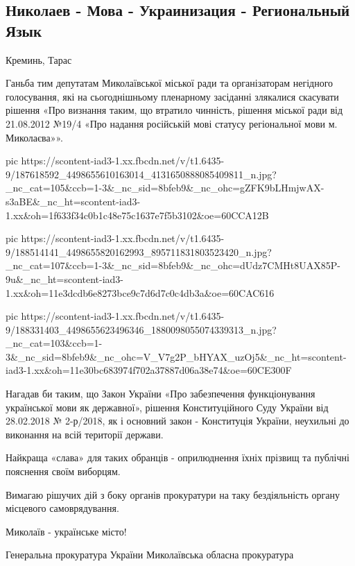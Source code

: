  
 
 
 
 

\subsection{Николаев - Мова - Украинизация - Региональный Язык}

Креминь, Тарас

Ганьба тим депутатам Миколаївської міської ради та організаторам негідного
голосування, які на сьогоднішньому пленарному засіданні злякалися скасувати
рішення «Про визнання таким, що втратило чинність, рішення міської ради від
21.08.2012 №19/4 «Про надання російській мові статусу регіональної мови м.
Миколаєва»». 

\ifcmt
  pic https://scontent-iad3-1.xx.fbcdn.net/v/t1.6435-9/187618592_4498655610163014_4131650888085409811_n.jpg?_nc_cat=105&ccb=1-3&_nc_sid=8bfeb9&_nc_ohc=gZFK9bLHmjwAX-s3aBE&_nc_ht=scontent-iad3-1.xx&oh=1f633f34c0b1c48e75c1637e7f5b3102&oe=60CCA12B

  pic https://scontent-iad3-1.xx.fbcdn.net/v/t1.6435-9/188514141_4498655820162993_895711831803523420_n.jpg?_nc_cat=107&ccb=1-3&_nc_sid=8bfeb9&_nc_ohc=dUdz7CMHt8UAX85P-9u&_nc_ht=scontent-iad3-1.xx&oh=11e3dcdb6e8273bce9c7d6d7c0c4db3a&oe=60CAC616

  pic https://scontent-iad3-1.xx.fbcdn.net/v/t1.6435-9/188331403_4498655623496346_1880098055074339313_n.jpg?_nc_cat=103&ccb=1-3&_nc_sid=8bfeb9&_nc_ohc=V_V7g2P_bHYAX_uzOj5&_nc_ht=scontent-iad3-1.xx&oh=11e30bc683974f702a37887d06a38e74&oe=60CE300F
\fi


Нагадав би таким, що Закон України «Про забезпечення функціонування української
мови як державної», рішення Конституційного Суду України від 28.02.2018 №
2-р/2018, як і основний закон - Конституція України, неухильні до виконання на
всій території держави.

Найкраща «слава» для таких обранців - оприлюднення їхніх прізвищ та публічні пояснення своїм виборцям. 

Вимагаю рішучих дій з боку органів прокуратури на таку бездіяльність органу місцевого самоврядування.

Миколаїв - українське місто!

Генеральна прокуратура України
Миколаївська обласна прокуратура

